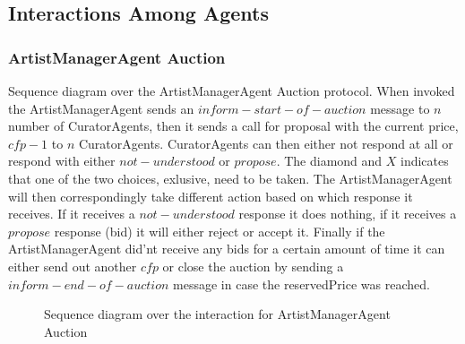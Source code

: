 \documentclass[paper=letter, fontsize=12pt]{article}
\begin{document}
\subsection{Interactions Among Agents}
\subsubsection{ArtistManagerAgent Auction}
Sequence diagram over the ArtistManagerAgent Auction protocol. When invoked the ArtistManagerAgent sends an $inform-start-of-auction$ message to $n$ number of CuratorAgents, then it sends a call for proposal  with the current price,  $cfp-1$ to $n$ CuratorAgents. CuratorAgents can then either not respond at all or respond with either $not-understood$ or $propose$. The diamond and $X$ indicates that one of the two choices, exlusive, need to be taken. The ArtistManagerAgent will then correspondingly take different action based on which response it receives. If it receives a $not-understood$ response it does nothing, if it receives a $propose$ response (bid) it will either reject or accept it. Finally if the ArtistManagerAgent did'nt receive any bids for a certain amount of time it can either send out another $cfp$ or close the auction by sending a $inform-end-of-auction$ message in case the reservedPrice was reached.
\begin{figure}[H]
  \begin{center}
    \caption{Sequence diagram over the interaction for ArtistManagerAgent Auction}
    \label{fig:artist_auction_sequence}
  \end{center}
\end{figure}
\end{document}
